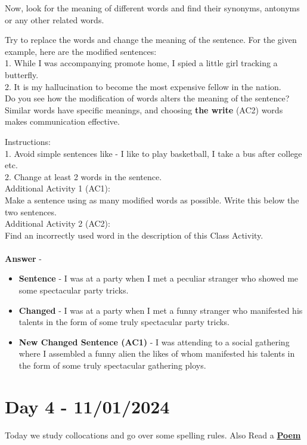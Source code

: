 \documentclass[a4paper,30pt]{report}
\begin{document}
Now, look for the meaning of different words and find their synonyms, antonyms or any other related words. 

Try to replace the words and change the meaning of the sentence. For the given example, here are the modified sentences:\\
1. While I was accompanying promote home, I spied a little girl tracking a butterfly.\\
2. It is my hallucination to become the most expensive fellow in the nation.\\

Do you see how the modification of words alters the meaning of the sentence? Similar words have specific meanings, and choosing \textbf{the write} (AC2) words makes communication effective.

Instructions: \\
1. Avoid simple sentences like - I like to play basketball, I take a bus after college etc.\\
2. Change at least 2 words in the sentence.\\

Additional Activity 1 (AC1):\\
Make a sentence using as many modified words as possible. Write this below the two sentences.\\
Additional Activity 2 (AC2):\\
Find an incorrectly used word in the description of this Class Activity. \\\\

    \textbf{Answer} - 
    \begin{itemize}
      \item  \textbf{Sentence} - I was at a party when I met a peculiar stranger who showed me some spectacular party tricks. 
      \item \textbf{Changed} -  I was at a party when I met a funny stranger who manifested his talents in the form of some truly spectacular party tricks.
      \item \textbf{New Changed Sentence (AC1)} - I was attending to a social gathering where I assembled a funny alien the likes of whom manifested his talents in the form of some truly spectacular gathering ploys. 
    \end{itemize}
  

  \chapter{Day 4 - 11/01/2024}
    Today we study collocations and go over some spelling rules. Also Read a \href{https://drive.google.com/file/d/1--IABOxrbkADAgSGHDRYENKqqDqNwP_j/view?usp=sharing}{\textbf{Poem}}\\
\end{document}
